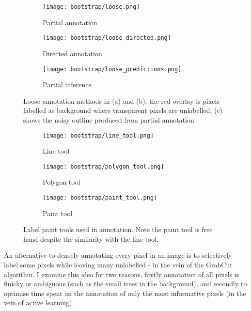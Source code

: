 \begin{figure}[!ht]
\centering
\begin{subfigure}[t]{.33\textwidth}
  \centering
  \texttt{[image: bootstrap/loose.png]}
  \caption{Partial annotation}
  \label{fig:bootstrap_loose_annot}
\end{subfigure}%
\begin{subfigure}[t]{.33\textwidth}
  \centering
  \texttt{[image: bootstrap/loose\_directed.png]}
  \caption{Directed annotation}
  \label{fig:bootstrap_loose_dir}

\end{subfigure}%
\begin{subfigure}[t]{.33\textwidth}
  \centering
  \texttt{[image: bootstrap/loose\_predictions.png]}
  \caption{Partial inference}
  \label{fig:bootstrap_loose_pred}
\end{subfigure}
  \caption{Loose annotation methods in (a) and (b), the red overlay is pixels labelled as background where transparent pixels are unlabelled, (c) shows the  noisy outline produced from partial annotation }


\end{figure}

\begin{figure}
\centering
\begin{subfigure}[t]{.33\textwidth}
  \centering
  \texttt{[image: bootstrap/line\_tool.png]}
  \caption{Line tool}
\end{subfigure}%
\begin{subfigure}[t]{.33\textwidth}
  \centering
  \texttt{[image: bootstrap/polygon\_tool.png]}
  \caption{Polygon tool}
\end{subfigure}%
\begin{subfigure}[t]{.33\textwidth}
  \centering
  \texttt{[image: bootstrap/paint\_tool.png]}
  \caption{Paint tool}
\end{subfigure}%

  \caption{Label paint tools used in annotation. Note the paint tool is free hand despite the similarity with the line tool.}
  \label{fig:bootstrap_tools}

\end{figure}



An alternative to densely annotating every pixel in an image is to selectively label some pixels while leaving many unlabelled - in the vein of the GrabCut algorithm. I examine this idea for two reasons, firstly annotation of all pixels is finicky or ambiguous (such as the small trees in the background), and secondly to optimise time spent on the annotation of only the most informative pixels (in the vein of active learning).

